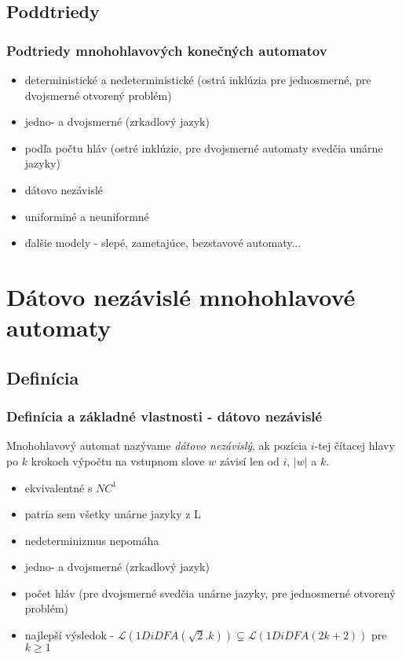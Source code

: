 \documentclass[slovak]{beamer}
\begin{document}

\subsection{Poddtriedy}

\begin{frame}
\frametitle{Podtriedy mnohohlavových konečných automatov}

\begin{itemize}
\item deterministické a nedeterministické (ostrá inklúzia pre jednosmerné, pre dvojsmerné otvorený problém)
\item jedno- a dvojsmerné (zrkadlový jazyk)
\item podľa počtu hláv (ostré inklúzie, pre dvojsmerné automaty svedčia unárne jazyky) \cite{yr}
\item dátovo nezávislé
\item uniforminé a neuniformné
\item ďalšie modely - slepé, zametajúce, bezstavové automaty...
\end{itemize}
\end{frame}


\section{Dátovo nezávislé mnohohlavové automaty}

\subsection{Definícia}

\begin{frame}
\frametitle{Definícia a základné vlastnosti - dátovo nezávislé}

\begin{definition}
Mnohohlavový automat nazývame \emph{dátovo nezávislý}, ak pozícia $i$-tej čítacej hlavy po $k$ krokoch výpočtu na vstupnom slove $w$ závisí len od $i$, $\left| w \right|$ a $k$. 
\end{definition}
\begin{itemize}
\item ekvivalentné s $NC^{1}$ \cite{mh}
\item patria sem všetky unárne jazyky z L
\item nedeterminizmus nepomáha
\item jedno- a dvojsmerné (zrkadlový jazyk)
\item počet hláv (pre dvojsmerné svedčia unárne jazyky, pre jednosmerné otvorený problém)
\item najlepší výsledok - $\mathcal{L} (1DiDFA(\sqrt{2}.k)) \subsetneq \mathcal{L} (1DiDFA(2k+2))$ pre $k \geq 1$ \cite{dur}
\end{itemize}
\end{frame}
\end{document}
